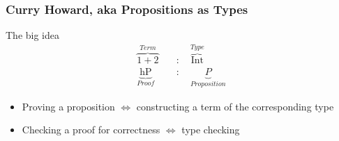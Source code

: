 \documentclass{beamer}
\begin{document}
\begin{frame}[fragile]
  \frametitle{Curry Howard, aka Propositions as Types}

  \begin{block} {The big idea}
    \begin{align*}
      \overbrace{1 + 2}^{Term} \quad &: \quad \overbrace{\text{Int}}^{Type} \\
      \underbrace{\text{hP}}_{Proof} \quad &: \quad \underbrace{P}_{Proposition}
    \end{align*}
    \begin{itemize}[label=$\ast$]
      \item
        Proving a proposition $\Leftrightarrow$ constructing a term of the
        corresponding type
      \item
        Checking a proof for correctness $\Leftrightarrow$ type checking
    \end{itemize}
  \end{block}



  
\end{frame}
\end{document}
